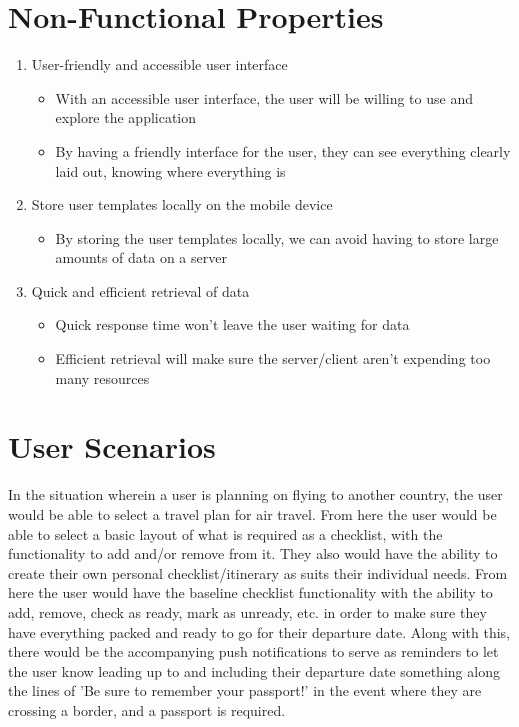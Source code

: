 \documentclass[12pt]{article}
\begin{document}
\section*{Non-Functional Properties}


	\begin{enumerate}

		\item{User-friendly and accessible user interface}
		    \begin{itemize}
		        \item{With an accessible user interface, the user will be willing to use and explore the application}
		        \item{By having a friendly interface for the user, they can see everything clearly laid out, knowing where everything is}
		    \end{itemize}
		    
		\item{Store user templates locally on the mobile device}
		    \begin{itemize}
		        \item{By storing the user templates locally, we can avoid having to store large amounts of data on a server}
		    \end{itemize}
		    
        \item{Quick and efficient retrieval of data}
            \begin{itemize}
                \item{Quick response time won't leave the user waiting for data}
                \item{Efficient retrieval will make sure the server/client aren't expending too many resources}
            \end{itemize}
    \end{enumerate}



\section*{User Scenarios}

	In the situation wherein a user is planning on flying to another country, the user would be able to select a travel plan for air travel.
	From here the user would be able to select a basic layout of what is required as a checklist, with the functionality to add and/or remove from it.
	They also would have the ability to create their own personal checklist/itinerary as suits their individual needs.
	From here the user would have the baseline checklist functionality with the ability to add, remove, check as ready, mark as unready, etc. in order to make sure they have everything packed and ready to go for their departure date.
	Along with this, there would be the accompanying push notifications to serve as reminders to let the user know leading up to and including their departure date something along the lines of 'Be sure to remember your passport!' in the event where they are crossing a border, and a passport is required.
\end{document}
